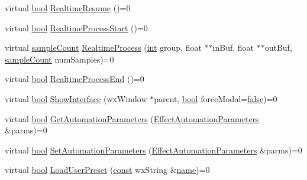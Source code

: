 \begin{DoxyCompactItemize}
\item 
virtual \hyperlink{mac_2config_2i386_2lib-src_2libsoxr_2soxr-config_8h_abb452686968e48b67397da5f97445f5b}{bool} \hyperlink{class_effect_client_interface_ad81a9bd496a5c1524f48f90a097b5370}{Realtime\+Resume} ()=0
\item 
virtual \hyperlink{mac_2config_2i386_2lib-src_2libsoxr_2soxr-config_8h_abb452686968e48b67397da5f97445f5b}{bool} \hyperlink{class_effect_client_interface_afb2d51c56fefa83d61ace67285c07369}{Realtime\+Process\+Start} ()=0
\item 
virtual \hyperlink{include_2audacity_2_types_8h_afa427e1f521ea5ec12d054e8bd4d0f71}{sample\+Count} \hyperlink{class_effect_client_interface_ae4e1abb8aebf453623cbad9c8162476d}{Realtime\+Process} (\hyperlink{xmltok_8h_a5a0d4a5641ce434f1d23533f2b2e6653}{int} group, float $\ast$$\ast$in\+Buf, float $\ast$$\ast$out\+Buf, \hyperlink{include_2audacity_2_types_8h_afa427e1f521ea5ec12d054e8bd4d0f71}{sample\+Count} num\+Samples)=0
\item 
virtual \hyperlink{mac_2config_2i386_2lib-src_2libsoxr_2soxr-config_8h_abb452686968e48b67397da5f97445f5b}{bool} \hyperlink{class_effect_client_interface_a40eec7c463570c35d805f484681492e1}{Realtime\+Process\+End} ()=0
\item 
virtual \hyperlink{mac_2config_2i386_2lib-src_2libsoxr_2soxr-config_8h_abb452686968e48b67397da5f97445f5b}{bool} \hyperlink{class_effect_client_interface_abceb172286406361a1cf5e871b284fd1}{Show\+Interface} (wx\+Window $\ast$parent, \hyperlink{mac_2config_2i386_2lib-src_2libsoxr_2soxr-config_8h_abb452686968e48b67397da5f97445f5b}{bool} force\+Modal=\hyperlink{mac_2config_2i386_2lib-src_2libsoxr_2soxr-config_8h_a65e9886d74aaee76545e83dd09011727}{false})=0
\item 
virtual \hyperlink{mac_2config_2i386_2lib-src_2libsoxr_2soxr-config_8h_abb452686968e48b67397da5f97445f5b}{bool} \hyperlink{class_effect_client_interface_ad4592ee1818e3b69ebaa2956ec79d924}{Get\+Automation\+Parameters} (\hyperlink{class_effect_automation_parameters}{Effect\+Automation\+Parameters} \&parms)=0
\item 
virtual \hyperlink{mac_2config_2i386_2lib-src_2libsoxr_2soxr-config_8h_abb452686968e48b67397da5f97445f5b}{bool} \hyperlink{class_effect_client_interface_aa51d84c0061ff19b0b18561adb25d29b}{Set\+Automation\+Parameters} (\hyperlink{class_effect_automation_parameters}{Effect\+Automation\+Parameters} \&parms)=0
\item 
virtual \hyperlink{mac_2config_2i386_2lib-src_2libsoxr_2soxr-config_8h_abb452686968e48b67397da5f97445f5b}{bool} \hyperlink{class_effect_client_interface_a962ca35e12b03c54c74f9a4834633e21}{Load\+User\+Preset} (\hyperlink{getopt1_8c_a2c212835823e3c54a8ab6d95c652660e}{const} wx\+String \&\hyperlink{lib_2expat_8h_a1b49b495b59f9e73205b69ad1a2965b0}{name})=0

\end{DoxyCompactItemize}
